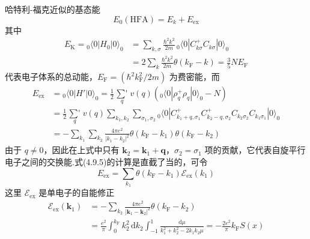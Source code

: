 哈特利-福克近似的基态能
\begin{equation}
  E_{0}\left(\mathrm{HFA}\right)=E_{k}+E_{\mathrm{ex}}
\end{equation}
其中
\begin{equation}
\begin{aligned}
  E_{\mathrm{K}}={}_{0}\langle 0|H_{0}|0\rangle_{0}
  &=\sum_{k,\sigma}\frac{\hbar^{2}k^{2}}{2m}\,
  {}_{0}\langle 0|C_{k\sigma}^{+}C_{k\sigma}|0\rangle_{0}\\
  &=2\sum_{k}\frac{\hbar^{2}k^{2}}{2m}\theta\left(k_{\mathrm{F}}-k\right)
  =\frac{3}{5}NE_{\mathrm{F}}
\end{aligned}
\end{equation}
代表电子体系的总动能，$E_{\mathrm{F}}=\left(\hbar^{2}k_{\mathrm{F}}^{2}/2m\right)$ 为费密能，而
\begin{equation}
\begin{aligned}
  E_{\mathrm{ex}}&={}_{0}\langle 0|H'|0\rangle_{0}
  =\frac{1}{2}\mathop{{\sum}'}\limits_{q}v(q)
  \left({}_{0}\langle 0|\rho_{q}^{+}\rho_{q}|0\rangle_{0}-N\right)\\
  &=\frac{1}{2}\mathop{{\sum}'}\limits_{q}v(q)\sum_{k_{1},k_{2}}\sum_{\sigma_{1},\sigma_{2}}
  {}_{0}\langle 0|C_{k_{1}+q,\sigma_{1}}^{+}C_{k_{2}-q,\sigma_{2}}^{+}
  C_{k_{2}\sigma_{2}}C_{k_{1}\sigma_{1}}|0\rangle_{0}\\
  &=-\sum_{k_{1}}\sum_{k_{2}}
  \frac{4\pi e^{2}}{|k_{1}-k_{2}|^{2}}
  \theta\left(k_{\mathrm{F}}-k_{1}\right)\theta\left(k_{\mathrm{F}}-k_{2}\right)
\end{aligned}
\end{equation}
由于 $q\neq 0$，因此在上式中只有 $\boldsymbol{k}_{2}=\boldsymbol{k}_{1}+\boldsymbol{q}$，$\sigma_{2}=\sigma_{1}$ 项的贡献，它代表自旋平行电子之间的交换能.式(4.9.5)的计算是直截了当的，可令
\begin{equation}
  E_{\mathrm{ex}}=\sum_{k_{1}}\theta\left(k_{\mathrm{F}}-k_{1}\right)
  \mathcal{E}_{\mathrm{ex}}\left(k_{1}\right)
\end{equation}
这里 $\mathcal{E}_{\mathrm{ex}}$ 是单电子的自能修正
\begin{equation}
\begin{aligned}
  \mathcal{E}_{\mathrm{ex}}(\boldsymbol{k}_{1})
  &=-\sum_{k_{2}}\frac{4\pi e^{2}}{|\boldsymbol{k}_{1}-\boldsymbol{k}_{2}|^{2}}
  \theta\left(k_{\mathrm{F}}-k_{2}\right)\\
  &=\frac{e^{2}}{\pi}\int_{0}^{k_{\mathrm{F}}}k_{2}^{2}\,\mathrm{d}k_{2}
  \int_{-1}^{1}\frac{\mathrm{d}\mu}{k_{1}^{2}+k_{2}^{2}-2k_{1}k_{2}\mu}
  =-\frac{2e^{2}}{\pi}k_{\mathrm{F}}S(x)
\end{aligned}
\end{equation}
